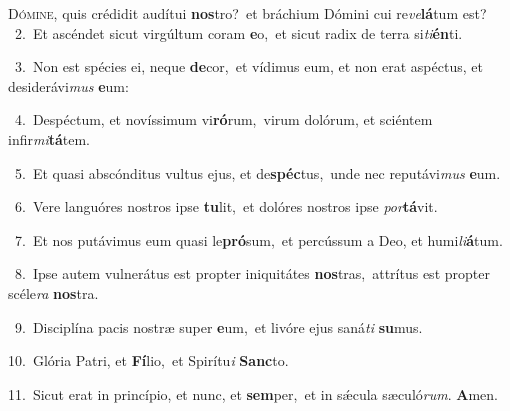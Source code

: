 \lettrine{\initial\textcolor{\initialcolor}{D}}{ómine,} quis crédidit audítui \textbf{nos}\-tro?~\star et bráchium Dómini cui re\-\textit{ve}\-\textbf{lá}tum est?\\
{\numbfont\textcolor{\numbcolor}{~2.}}~Et ascéndet sicut virgúltum coram \textbf{e}\-o,~\star et sicut radix de terra si\-\textit{ti}\-\textbf{én}ti.\par
{\numbfont\textcolor{\numbcolor}{~3.}}~Non est spécies ei, neque \textbf{de}\-cor,~\star et vídimus eum, et non erat aspéctus, et desiderávi\textit{mus} \textbf{e}\-um:\par
{\numbfont\textcolor{\numbcolor}{~4.}}~Despéctum, et novíssimum vi\-\textbf{ró}\-rum,~\star virum dolórum, et sciéntem infir\-\textit{mi}\-\textbf{tá}tem.\par
{\numbfont\textcolor{\numbcolor}{~5.}}~Et quasi abscónditus vultus ejus, et de\-\textbf{spéc}\-tus,~\star unde nec reputávi\textit{mus} \textbf{e}\-um.\par
{\numbfont\textcolor{\numbcolor}{~6.}}~Vere languóres nostros ipse \textbf{tu}\-lit,~\star et dolóres nostros ipse \textit{por}\-\textbf{tá}vit.\par
{\numbfont\textcolor{\numbcolor}{~7.}}~Et nos putávimus eum quasi le\-\textbf{pró}\-sum,~\star et percússum a Deo, et humi\-\textit{li}\-\textbf{á}tum.\par
{\numbfont\textcolor{\numbcolor}{~8.}}~Ipse autem vulnerátus est propter iniquitátes \textbf{nos}\-tras,~\star attrítus est propter scéle\textit{ra} \textbf{nos}\-tra.\par
{\numbfont\textcolor{\numbcolor}{~9.}}~Disciplína pacis nostræ super \textbf{e}\-um,~\star et livóre ejus saná\textit{ti} \textbf{su}\-mus.\par
{\numbfont\textcolor{\numbcolor}{10.}}~Glória Patri, et \textbf{Fí}\-lio,~\star et Spirítu\textit{i} \textbf{Sanc}\-to.\par
{\numbfont\textcolor{\numbcolor}{11.}}~Sicut erat in princípio, et nunc, et \textbf{sem}\-per,~\star et in sǽcula sæculó\-\textit{rum}\-. \textbf{A}\-men.\par

